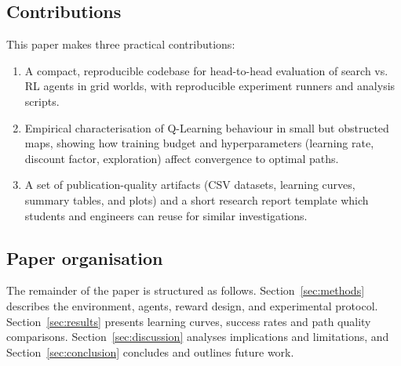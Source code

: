 \subsection{Contributions}
This paper makes three practical contributions:
\begin{enumerate}
  \item A compact, reproducible codebase for head-to-head evaluation of search vs. RL agents in grid worlds, with reproducible experiment runners and analysis scripts.
  \item Empirical characterisation of Q-Learning behaviour in small but obstructed maps, showing how training budget and hyperparameters (learning rate, discount factor, exploration) affect convergence to optimal paths.
  \item A set of publication-quality artifacts (CSV datasets, learning curves, summary tables, and plots) and a short research report template which students and engineers can reuse for similar investigations.
\end{enumerate}

\subsection{Paper organisation}
The remainder of the paper is structured as follows. Section~\ref{sec:methods} describes the environment, agents, reward design, and experimental protocol. Section~\ref{sec:results} presents learning curves, success rates and path quality comparisons. Section~\ref{sec:discussion} analyses implications and limitations, and Section~\ref{sec:conclusion} concludes and outlines future work.

